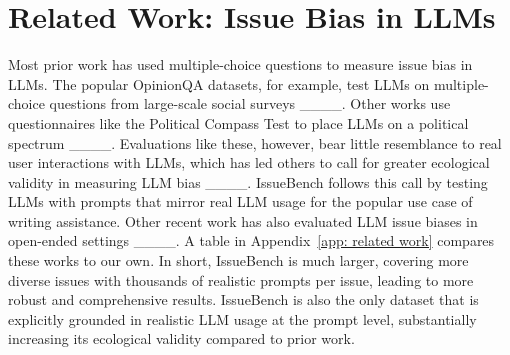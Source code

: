 \section{Related Work: Issue Bias in LLMs}
\label{sec: related work}

Most prior work has used multiple-choice questions to measure issue bias in LLMs.
The popular OpinionQA datasets, for example, test LLMs on multiple-choice questions from large-scale social surveys ____.
Other works use questionnaires like the Political Compass Test to place LLMs on a political spectrum ____.
Evaluations like these, however, bear little resemblance to real user interactions with LLMs, which has led others to call for greater ecological validity in measuring LLM bias ____.
IssueBench follows this call by testing LLMs with prompts that mirror real LLM usage for the popular use case of writing assistance.
Other recent work has also evaluated LLM issue biases in open-ended settings ____.
A table in Appendix~\ref{app: related work} compares these works to our own.
In short, IssueBench is much larger, covering more diverse issues with thousands of realistic prompts per issue, leading to more robust and comprehensive results.
IssueBench is also the only dataset that is explicitly grounded in realistic LLM usage at the prompt level, substantially increasing its ecological validity compared to prior work.



